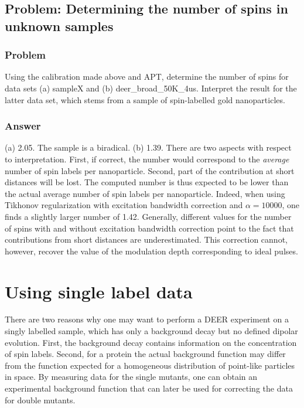 \documentclass[11pt,a4paper]{article}
\begin{document}
\subsection{Problem: Determining the number of spins in unknown samples}

\subsubsection*{Problem}
Using the calibration made above and APT, determine the number of spins for data sets (a) {\ttfamily sampleX} and (b) {\ttfamily deer\_broad\_50K\_4us}. Interpret the result for the latter data set, which stems from a sample of spin-labelled gold nanoparticles.

\subsubsection*{Answer}
(a) 2.05. The sample is a biradical.
(b) 1.39. There are two aspects with respect to interpretation. First, if correct, the number would correspond to the \emph{average} number of spin labels per nanoparticle. Second, part of the contribution at short distances will be lost. The computed number is thus expected to be lower than the actual average number of spin labels per nanoparticle. Indeed, when using Tikhonov regularization with excitation bandwidth correction and $\alpha=10000$, one finds a slightly larger number of 1.42. Generally, different values for the number of spins with and without excitation bandwidth correction point to the fact that contributions from short distances are underestimated. This correction cannot, however, recover the value of the modulation depth corresponding to ideal pulses.

\section{Using single label data}
There are two reasons why one may want to perform a DEER experiment on a singly labelled sample, which has only a background decay but no defined dipolar evolution. First, the background decay contains information on the concentration of spin labels. Second, for a protein the actual background function may differ from the function expected for a homogeneous distribution of point-like particles in space. By measuring data for the single mutants, one can obtain an experimental background function that can later be used for correcting the data for double mutants.
\end{document}

